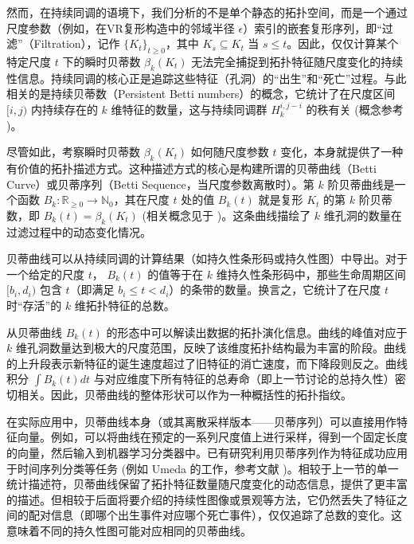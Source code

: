             然而，在持续同调的语境下，我们分析的不是单个静态的拓扑空间，而是一个通过尺度参数（例如，在VR复形构造中的邻域半径 $\epsilon$）索引的嵌套复形序列，即“过滤”（Filtration），记作 $\{K_t\}_{t \ge 0}$，其中 $K_s \subseteq K_t$ 当 $s \le t$。因此，仅仅计算某个特定尺度 $t$ 下的瞬时贝蒂数 $\beta_k(K_t)$ 无法完全捕捉到拓扑特征随尺度变化的持续性信息。持续同调的核心正是追踪这些特征（孔洞）的“出生”和“死亡”过程。与此相关的是持续贝蒂数（Persistent Betti numbers）的概念，它统计了在尺度区间 $[i, j)$ 内持续存在的 $k$ 维特征的数量，这与持续同调群 $H_k^{i, j-i}$ 的秩有关 (概念参考 \cite{source:53})。
            
            尽管如此，考察瞬时贝蒂数 $\beta_k(K_t)$ 如何随尺度参数 $t$ 变化，本身就提供了一种有价值的拓扑描述方式。这种描述方式的核心是构建所谓的贝蒂曲线（Betti Curve）或贝蒂序列（Betti Sequence，当尺度参数离散时）。第 $k$ 阶贝蒂曲线是一个函数 $B_k: \mathbb{R}_{\ge 0} \rightarrow \mathbb{N}_0$，其在尺度 $t$ 处的值 $B_k(t)$ 就是复形 $K_t$ 的第 $k$ 阶贝蒂数，即 $B_k(t) = \beta_k(K_t)$ (相关概念见于 \cite{source:59, source:295, source:358})。这条曲线描绘了 $k$ 维孔洞的数量在过滤过程中的动态变化情况。
            
            贝蒂曲线可以从持续同调的计算结果（如持久性条形码或持久性图）中导出。对于一个给定的尺度 $t$， $B_k(t)$ 的值等于在 $k$ 维持久性条形码中，那些生命周期区间 $[b_i, d_i)$ 包含 $t$（即满足 $b_i \le t < d_i$）的条带的数量。换言之，它统计了在尺度 $t$ 时“存活”的 $k$ 维拓扑特征的总数。
            
            从贝蒂曲线 $B_k(t)$ 的形态中可以解读出数据的拓扑演化信息。曲线的峰值对应于 $k$ 维孔洞数量达到极大的尺度范围，反映了该维度拓扑结构最为丰富的阶段。曲线的上升段表示新特征的诞生速度超过了旧特征的消亡速度，而下降段则反之。曲线积分 $\int B_k(t) dt$ 与对应维度下所有特征的总寿命（即上一节讨论的总持久性）密切相关。因此，贝蒂曲线的整体形状可以作为一种概括性的拓扑指纹。
            
            在实际应用中，贝蒂曲线本身（或其离散采样版本——贝蒂序列）可以直接用作特征向量。例如，可以将曲线在预定的一系列尺度值上进行采样，得到一个固定长度的向量，然后输入到机器学习分类器中。已有研究利用贝蒂序列作为特征成功应用于时间序列分类等任务 (例如 Umeda 的工作，参考文献 \cite{source:495})。相较于上一节的单一统计描述符，贝蒂曲线保留了拓扑特征数量随尺度变化的动态信息，提供了更丰富的描述。但相较于后面将要介绍的持续性图像或景观等方法，它仍然丢失了特征之间的配对信息（即哪个出生事件对应哪个死亡事件），仅仅追踪了总数的变化。这意味着不同的持久性图可能对应相同的贝蒂曲线。
            
